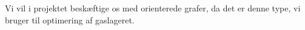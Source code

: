 %

Vi vil i projektet beskæftige os med orienterede grafer, da det er denne type, vi bruger til optimering af gaslageret. 
